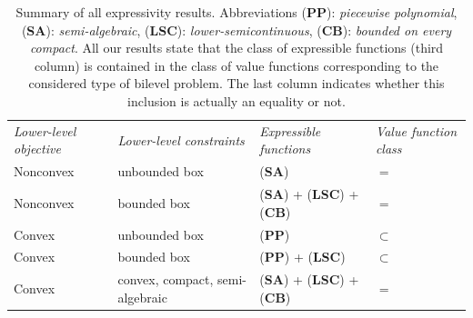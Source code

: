 \documentclass{article}
\theoremstyle{plain}
\theoremstyle{definition}
\begin{document}

\begin{table}[htbp]
    \scriptsize
	\begin{tabular}{>{\centering\arraybackslash}m{3.2cm}>{\centering\arraybackslash}m{3.3cm}|>{\centering\arraybackslash}m{4.0cm}>{\centering\arraybackslash}m{2.7cm}}
            \toprule
            \multicolumn{2}{c}{\textbf{Type of bilevel problem}} & 
            \multicolumn{2}{c}{\textbf{Expressivity result}}\\
            \toprule
		\textit{Lower-level objective}& \textit{Lower-level constraints} & \textit{Expressible functions}& \textit{Value function class}\\
		\toprule	
        Nonconvex & unbounded box & (\textbf{SA}) & $=$ \\
        \midrule
        Nonconvex & bounded box & (\textbf{SA}) + (\textbf{LSC}) + (\textbf{CB}) & $=$ \\
	\midrule
        Convex & unbounded box & (\textbf{PP}) & $\subset$ \\
        \midrule
        Convex  & bounded box & (\textbf{PP}) + (\textbf{LSC}) & $\subset$ \\
        \midrule
        Convex  & convex, compact, semi-algebraic & (\textbf{SA}) + (\textbf{LSC}) + (\textbf{CB}) & $=$ \\
		\bottomrule
	\end{tabular}
    \caption{Summary of all expressivity results. Abbreviations (\textbf{PP}): \emph{piecewise polynomial}, (\textbf{SA}): \emph{semi-algebraic}, (\textbf{LSC}): \emph{lower-semicontinuous}, (\textbf{CB}): \emph{bounded on every compact}. All our results state that the class of expressible functions (third column) is contained in the class of value functions corresponding to the considered type of bilevel problem. The last column indicates whether this inclusion is actually an equality or not.\label{tab:expressivity}}
\end{table}
\end{document}
